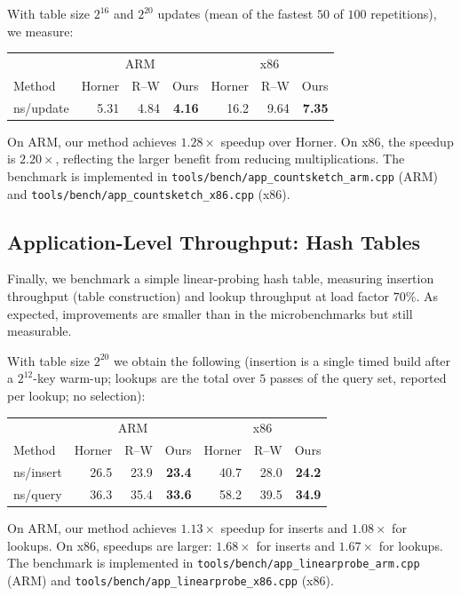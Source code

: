 With table size $2^{16}$ and $2^{20}$ updates (mean of the fastest $50$ of $100$ repetitions), we measure:
\begin{center}
\begin{tabular}{l|rrr|rrr}
& \multicolumn{3}{c|}{ARM} & \multicolumn{3}{c}{x86} \\
Method & Horner & R--W & Ours & Horner & R--W & Ours \\
\hline
ns/update & 5.31 & 4.84 & \textbf{4.16} & 16.2 & 9.64 & \textbf{7.35}
\end{tabular}
\end{center}
On ARM, our method achieves $1.28\times$ speedup over Horner.
On x86, the speedup is $2.20\times$, reflecting the larger benefit from reducing multiplications.
The benchmark is implemented in \texttt{tools/bench/\allowbreak app\_\allowbreak countsketch\_\allowbreak arm.cpp} (ARM) and
\texttt{tools/bench/\allowbreak app\_\allowbreak countsketch\_\allowbreak x86.cpp} (x86).

\subsection{Application-Level Throughput: Hash Tables}
\label{sec:experiments:hashtable}

Finally, we benchmark a simple linear-probing hash table,
measuring insertion throughput (table construction) and lookup throughput at load factor $70\%$.
As expected, improvements are smaller than in the microbenchmarks but still measurable.

With table size $2^{20}$ we obtain the following (insertion is a single
timed build after a $2^{12}$-key warm-up; lookups are the total over $5$
passes of the query set, reported per lookup; no selection):
\begin{center}
\begin{tabular}{l|rrr|rrr}
& \multicolumn{3}{c|}{ARM} & \multicolumn{3}{c}{x86} \\
Method & Horner & R--W & Ours & Horner & R--W & Ours \\
\hline
ns/insert & 26.5 & 23.9 & \textbf{23.4} & 40.7 & 28.0 & \textbf{24.2} \\
ns/query  & 36.3 & 35.4 & \textbf{33.6} & 58.2 & 39.5 & \textbf{34.9}
\end{tabular}
\end{center}
On ARM, our method achieves $1.13\times$ speedup for inserts and $1.08\times$ for lookups.
On x86, speedups are larger: $1.68\times$ for inserts and $1.67\times$ for lookups.
The benchmark is implemented in \texttt{tools/bench/\allowbreak app\_linearprobe\_arm.cpp} (ARM) and
\texttt{tools/bench/\allowbreak app\_linearprobe\_x86.cpp} (x86).

